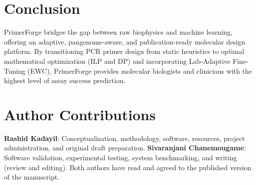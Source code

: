 \documentclass[twocolumn,10pt]{article}
\begin{document}
\section{Conclusion}
PrimerForge bridges the gap between raw biophysics and machine learning, offering an adaptive, pangenome-aware, and publication-ready molecular design platform. By transitioning PCR primer design from static heuristics to optimal mathematical optimization (ILP and DP) and incorporating Lab-Adaptive Fine-Tuning (EWC), PrimerForge provides molecular biologists and clinicians with the highest level of assay success prediction.

\section*{Author Contributions}
\textbf{Rashid Kadayil}: Conceptualization, methodology, software, resources, project administration, and original draft preparation. \textbf{Sivaranjani Chanemougame}: Software validation, experimental testing, system benchmarking, and writing (review and editing). Both authors have read and agreed to the published version of the manuscript.
\end{document}
